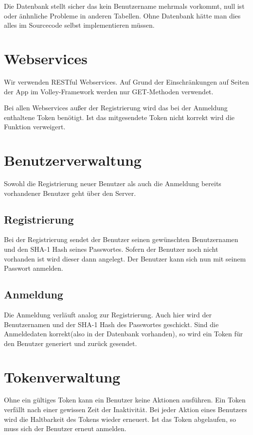 Die Datenbank stellt sicher das kein Benutzername mehrmals vorkommt,  null ist oder änhnliche Probleme in anderen Tabellen. Ohne Datenbank hätte man dies alles im Sourcecode selbst implementieren müssen.

\section{Webservices}
Wir verwenden RESTful Webservices. Auf Grund der Einschränkungen auf Seiten der App im Volley-Framework werden nur GET-Methoden verwendet. 

Bei allen Webservices außer der Registrierung wird das bei der Anmeldung enthaltene Token benötigt. Ist das mitgesendete Token nicht korrekt wird die Funktion verweigert.

\section{Benutzerverwaltung}
Sowohl die Registrierung neuer Benutzer als auch die Anmeldung bereits vorhandener Benutzer geht über den Server. 

\subsection{Registrierung}
Bei der Registrierung sendet der Benutzer seinen gewünschten Benutzernamen und den SHA-1 Hash seines Passwortes. Sofern der Benutzer noch nicht vorhanden ist wird dieser dann angelegt. Der Benutzer kann sich nun mit seinem Passwort anmelden.

\subsection{Anmeldung}
Die Anmeldung verläuft analog zur Registrierung. Auch hier wird der Benutzernamen und der SHA-1 Hash des Passwortes geschickt. Sind die Anmeldedaten korrekt(also in der Datenbank vorhanden), so wird ein Token für den Benutzer generiert und zurück gesendet.

\section{Tokenverwaltung}
Ohne ein gültiges Token kann ein Benutzer keine Aktionen ausführen. Ein Token verfällt nach einer gewissen Zeit der Inaktivität. Bei jeder Aktion eines Benutzers wird die Haltbarkeit des Tokens wieder erneuert. Ist das Token abgelaufen, so muss sich der Benutzer erneut anmelden.

